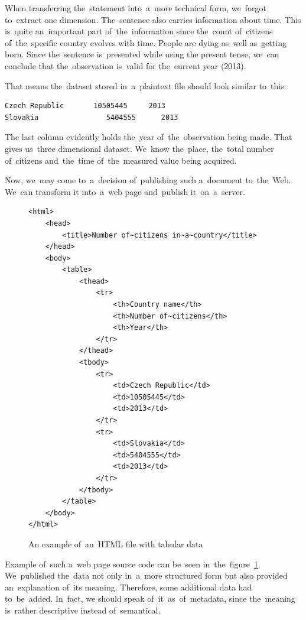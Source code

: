 When transferring the~statement into~a~more technical form, we~forgot to~extract one
dimension. The~sentence also carries information about time. This is~quite an~important
part of~the~information since the~count of~citizens of~the~specific country evolves with time.
People are dying as~well as~getting born. Since the~sentence is~presented while using the
present tense, we~can conclude that the~observation is~valid for the~current year (2013).

That means the~dataset stored in~a~plaintext file should look similar to~this:

\begin{verbatim}
Czech Republic       10505445     2013
Slovakia	            5404555      2013
\end{verbatim}

The last column evidently holds the~year of~the~observation being made.
That gives us~three dimensional dataset. We~know the~place, the~total number of~citizens and~the~time of~the~measured value being acquired.

Now, we~may come to~a~decision of~publishing such a~document to~the~Web. We~can transform
it into~a~web page and~publish it~on~a~server.
\begin{figure}
\small\begin{verbatim}
<html>
    <head>
        <title>Number of~citizens in~a~country</title>
    </head>
    <body>
        <table>
            <thead>
                <tr>
                    <th>Country name</th>
                    <th>Number of~citizens</th>
                    <th>Year</th>
                </tr>
            </thead>
            <tbody>
                <tr>
                    <td>Czech Republic</td>
                    <td>10505445</td>
                    <td>2013</td>
                </tr>
                <tr>
                    <td>Slovakia</td>
                    <td>5404555</td>
                    <td>2013</td>
                </tr>
            </tbody>
        </table>
    </body>
</html>
\end{verbatim}\normalsize
\caption{An example of~an~HTML file with tabular data}
\label{fig:rdf-html-01}
\end{figure}

Example of~such a~web page source code can be~seen in~the~figure~\ref{fig:rdf-html-01}. We~published the~data not only in~a~more structured form but also
provided an~explanation of~its meaning. Therefore, some additional data had to~be~added. In~fact, we
should speak of~it~as~of~metadata, since the~meaning is~rather descriptive instead of~semantical.

